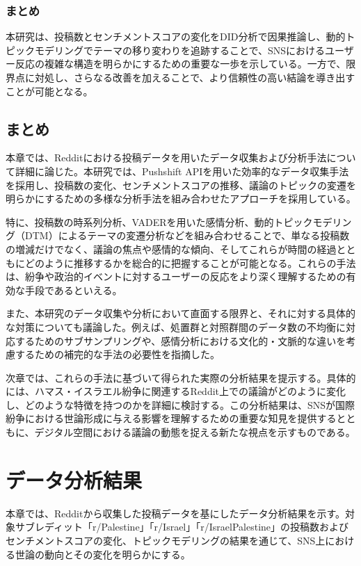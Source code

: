 \documentclass[11pt, a4j]{jreport}
\begin{document}
    \subsection{まとめ}
    本研究は、投稿数とセンチメントスコアの変化をDID分析で因果推論し、動的トピックモデリングでテーマの移り変わりを追跡することで、SNSにおけるユーザー反応の複雑な構造を明らかにするための重要な一歩を示している。一方で、限界点に対処し、さらなる改善を加えることで、より信頼性の高い結論を導き出すことが可能となる。

    \section{まとめ}
    本章では、Redditにおける投稿データを用いたデータ収集および分析手法について詳細に論じた。本研究では、Pushshift APIを用いた効率的なデータ収集手法を採用し、投稿数の変化、センチメントスコアの推移、議論のトピックの変遷を明らかにするための多様な分析手法を組み合わせたアプローチを採用している。

    特に、投稿数の時系列分析、VADERを用いた感情分析、動的トピックモデリング（DTM）によるテーマの変遷分析などを組み合わせることで、単なる投稿数の増減だけでなく、議論の焦点や感情的な傾向、そしてこれらが時間の経過とともにどのように推移するかを総合的に把握することが可能となる。これらの手法は、紛争や政治的イベントに対するユーザーの反応をより深く理解するための有効な手段であるといえる。

    また、本研究のデータ収集や分析において直面する限界と、それに対する具体的な対策についても議論した。例えば、処置群と対照群間のデータ数の不均衡に対応するためのサブサンプリングや、感情分析における文化的・文脈的な違いを考慮するための補完的な手法の必要性を指摘した。

    次章では、これらの手法に基づいて得られた実際の分析結果を提示する。具体的には、ハマス・イスラエル紛争に関連するReddit上での議論がどのように変化し、どのような特徴を持つのかを詳細に検討する。この分析結果は、SNSが国際紛争における世論形成に与える影響を理解するための重要な知見を提供するとともに、デジタル空間における議論の動態を捉える新たな視点を示すものである。

    \chapter{データ分析結果}
    本章では、Redditから収集した投稿データを基にしたデータ分析結果を示す。対象サブレディット「r/Palestine」「r/Israel」「r/IsraelPalestine」の投稿数およびセンチメントスコアの変化、トピックモデリングの結果を通じて、SNS上における世論の動向とその変化を明らかにする。
\end{document}
